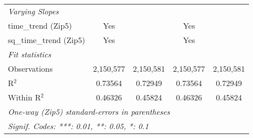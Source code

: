 \begin{table}[H]
{\begin{tabular}{lcccc}
 \midrule \emph{Varying Slopes}&   &   &   &  \\ 

 time\_trend (Zip5) & Yes &  & Yes & \\ 

 sq\_time\_trend (Zip5) & Yes &  & Yes & \\ 

 \midrule \emph{Fit statistics}&  & & & \\ 

 Observations & 2,150,577&2,150,581&2,150,577&2,150,581\\ 

 R$^2$ & 0.73564&0.72949&0.73564&0.72949\\ 

 Within R$^2$ & 0.46326&0.45824&0.46326&0.45824\\ 

 \midrule\midrule\multicolumn{5}{l}{\emph{One-way (Zip5) standard-errors in parentheses}}\\ 

 \multicolumn{5}{l}{\emph{Signif. Codes: ***: 0.01, **: 0.05, *: 0.1}}\\ 

 \end{tabular}} 

 \end{table} 

  

